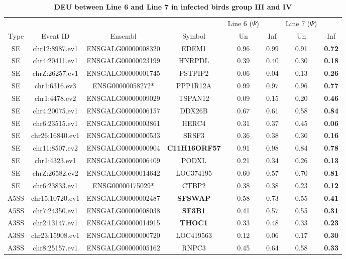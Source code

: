 \documentclass[10pt]{article}
\begin{document}
\begin{table}[!ht]
\caption{
\bf{DEU between Line 6 and Line 7 in infected birds group III and IV}}
\begin{tabular}{cccccccc}
\hline
& & & & Line 6 ($\Psi$) & & Line 7 ($\Psi$) & \\
Type & Event ID & Ensembl & Symbol  & Un & Inf & Un & Inf \\
\hline
SE & chr12:8987.ev1 & ENSGALG00000008320 & EDEM1 & 0.96 & 0.99 & 0.91 & \textbf{0.72} \\
SE & chr4:20411.ev1 & ENSGALG00000023199 & HNRPDL & 0.39 & 0.40 & 0.30 & \textbf{0.18} \\
SE & chrZ:26257.ev1 & ENSGALG00000001745 & PSTPIP2 & 0.06 & 0.04 & 0.13 & \textbf{0.26} \\
SE & chr1:6316.ev3 & ENSG00000058272* & PPP1R12A & 0.99 & 0.97 & 0.96 & \textbf{0.77} \\
SE & chr1:4478.ev2 & ENSGALG00000009029 & TSPAN12 & 0.09 & 0.15 & 0.20 & \textbf{0.46} \\
SE & chr4:20075.ev1 & ENSGALG00000006157 & DDX26B & 0.67 & 0.61 & 0.58 & \textbf{0.84} \\
SE & chr6:23515.ev1 & ENSGALG00000003861 & HERC4 & 0.31 & 0.37 & 0.45 & \textbf{0.06} \\
SE & chr26:16840.ev1 & ENSGALG00000000533 & SRSF3 & 0.36 & 0.38 & 0.30 & \textbf{0.16} \\
SE & chr11:8507.ev2 & ENSGALG00000000904 & \textbf{C11H16ORF57} & 0.91 & 0.98 & 0.84 & \textbf{0.78} \\
SE & chr1:4323.ev1 & ENSGALG00000006409 & PODXL & 0.21 & 0.34 & 0.26 & \textbf{0.13} \\
SE & chrZ:26582.ev2 & ENSGALG00000014642 & LOC374195 & 0.60 & 0.57 & 0.70 & \textbf{0.81} \\
SE & chr6:23833.ev1 & ENSG00000175029* & CTBP2 & 0.38 & 0.38 & 0.23 & \textbf{0.12} \\
A5SS & chr15:10720.ev1 & ENSGALG00000002487 & \textbf{SFSWAP} & 0.58 & 0.73 & 0.55 & \textbf{0.41} \\
A5SS & chr7:24350.ev1 & ENSGALG00000008038 & \textbf{SF3B1} & 0.41 & 0.57 & 0.55 & \textbf{0.31} \\
A3SS & chr2:13147.ev1 & ENSGALG00000014915 & \textbf{THOC1} & 0.33 & 0.48 & 0.33 & \textbf{0.23} \\
A3SS & chr23:15908.ev1 & ENSGALG00000000720 & LOC419563 & 0.12 & 0.06 & 0.17 & \textbf{0.30} \\
A3SS & chr8:25157.ev1 & ENSGALG00000005162 & RNPC3 & 0.45 & 0.64 & 0.58 & \textbf{0.33} \\

\end{tabular}
\end{table}
\end{document}
